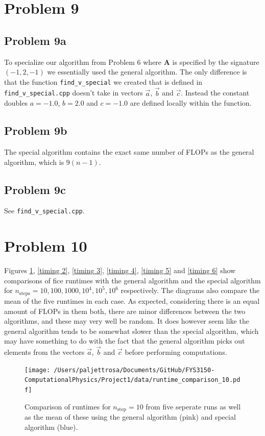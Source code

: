\documentclass[english,notitlepage]{revtex4-1}  %
\begin{document}
\section*{Problem 9}
\subsection*{Problem 9a}
To specialize our algorithm from Problem 6 where $\textbf{A}$ is specified by the signature $(-1, 2, -1)$ we essentially used the general algorithm. The only difference is that the function \verb|find_v_special| we created that is defined in \verb|find_v_special.cpp| doesn't take in vectors $\vec{a}$, $\vec{b}$ and $\vec{c}$. Instead the constant doubles $a = -1.0$, $b = 2.0$ and $c =-1.0$ are defined locally within the function.

\subsection*{Problem 9b}
The special algorithm contains the exact same number of FLOPs as the general algorithm, which is $9(n-1)$.

\subsection*{Problem 9c}
See \verb|find_v_special.cpp|.


\section*{Problem 10}
Figures \ref{timing 1}, \ref{timing 2}, \ref{timing 3}, \ref{timing 4}, \ref{timing 5} and \ref{timing 6} show comparisons of fice runtimes with the general algorithm and the special algorithm for $n_\text{steps} = 10, 100, 1000, 10^4, 10^5, 10^6$ respectively. The diagrams also compare the mean of the five runtimes in each case. As expected, considering there is an equal amount of FLOPs in them both, there are minor differences between the two algorithms, and these may very well be random. It does however seem like the general algorithm tends to be somewhat slower than the special algorithm, which may have something to do with the fact that the general algorithm picks out elements from the vectors $\vec{a}$, $\vec{b}$ and $\vec{c}$ before performing computations.

\begin{figure}[h!]
    \centering 
    \texttt{[image: /Users/paljettrosa/Documents/GitHub/FYS3150-ComputationalPhysics/Project1/data/runtime\_comparison\_10.pdf]} %
    \caption{Comparison of runtimes for $n_\text{step} = 10$ from five seperate runs as well as the mean of these using the general algorithm (pink) and special algorithm (blue).}
    \label{timing 1}
\end{figure}
\end{document}
